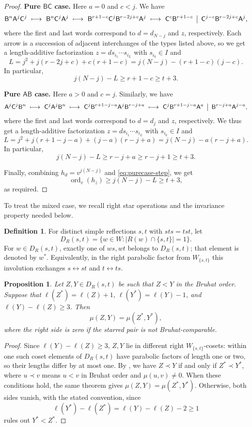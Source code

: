 \documentclass[11pt,a4paper,reqno]{amsart}
\numberwithin{equation}{section}
\newtheorem{proposition}[theorem]{Proposition}
\theoremstyle{definition}
\newtheorem{definition}[theorem]{Definition}
\theoremstyle{remark}
\theoremstyle{plain}
\newcommand{\ord}{\operatorname{ord}_v}
\newcommand{\A}{\mathsf A}
\newcommand{\B}{\mathsf B}
\newcommand{\CC}{\mathsf C}
\begin{document}
\begin{proof}
\smallskip\noindent
\textbf{Pure $\B\CC$ case.}
Here $a=0$ and $c<j$.
We have
\[
\B^n\A^j\CC^j\ \longmapsto\
\B^n\CC^j\A^j\ \longmapsto\
\B^{r+1-c}\CC^{j}\B^{r-2j+c}\A^j\ \longmapsto\
\CC^c\B^{r+1-c}\,\bigm|\,
 \CC^{j-c}\B^{r-2j+c}\A^j,
\]
where the first and last words correspond to $d=d_{N-j}$ and $z$, respectively.
Each arrow is a succession of adjacent interchanges of the types listed above, so we get a length-additive factorization $z=ds_{i_1}\cdots s_{i_L}$ with $s_{i_k}\in I$ and
\[
L=j^2+j(r-2j+c)+c(r+1-c)
=j(N-j)-(r+1-c)(j-c).
\]
In particular,
\[
j(N-j)-L\geq  r+1-c\geq t+3.
\]

\smallskip\noindent
\textbf{Pure $\A\B$ case.}
Here $a>0$ and $c=j$.
Similarly, we have
\[
\A^j\CC^j\B^n\ \longmapsto\
\CC^j\A^j\B^n\ \longmapsto\
\CC^j\B^{r+1-j-a}\A^j\B^{r-j+a}\ \longmapsto\
\CC^j\B^{r+1-j-a}\A^a\,\bigm|\,
\B^{r-j+a}\A^{j-a},
\]
where the first and last words correspond to $d=d_{j}$ and $z$, respectively.
We thus get a length-additive factorization $z=ds_{i_1}\cdots s_{i_L}$ with $s_{i_k}\in I$ and
\[
L=j^2+j(r+1-j-a)+(j-a)(r-j+a)
 =j(N-j)-a(r-j+a).
\]
In particular,
\[
j(N-j)-L\geq r-j+a\geq r-j+1\geq t+3.
\]

\smallskip
Finally, combining $h_{d}=v^{j(N-j)}$ and \cref{eq:purecase-step}, we get
\[
 \ord(h_z)  \geq j(N-j)-L \geq t+3,
\]
as required.
\end{proof}

To treat the mixed case, we recall right star operations and the invariance property needed below.

\begin{definition}\label{def:star}
For distinct simple reflections $s,t$ with $sts=tst$, let
\[
D_R(s,t)=\{w\in W:|R(w)\cap\{s,t\}|=1\}.
\]
For $w\in D_R(s,t)$, exactly one of $ws,wt$ belongs to
$D_R(s,t)$; that element is denoted by $w^*$.
Equivalently, in the right parabolic factor from $W_{\{s,t\}}$
this involution exchanges $s\leftrightarrow st$ and
$t\leftrightarrow ts$.
\end{definition}

\begin{proposition}\label{prop:star}
Let $Z,Y\in D_R(s,t)$ be such that $Z<Y$ in the Bruhat order.
Suppose that $\ell(Z^*)=\ell(Z)+1$, $\ell(Y^*)=\ell(Y)-1$, and $\ell(Y)-\ell(Z)\geq3$.
Then
\[
 \mu(Z,Y)=\mu(Z^*,Y^*),
\]
where the right side is zero if the starred pair is not Bruhat-comparable.
\end{proposition}
\begin{proof}
Since $\ell(Y)-\ell(Z)\geq3$, $Z,Y$ lie in different right $W_{\{s,t\}}$-cosets: within one such coset elements of $D_R(s,t)$ have parabolic factors of length one or two, so their lengths differ by at most one.
By \cite[Theorem~6.2]{Casselman}, we have $Z\prec Y$ if and only if $Z^*\prec Y^*$, where $u\prec v$ means $u<v$ in Bruhat order and $\mu(u,v)\ne0$.
When these conditions hold, the same theorem gives $\mu(Z,Y)=\mu(Z^*,Y^*)$.
Otherwise, both sides vanish, with the stated convention, since
\[
 \ell(Y^*)-\ell(Z^*)
 =\ell(Y)-\ell(Z)-2\geq1
\]
rules out $Y^*<Z^*$.
\end{proof}
\end{document}
